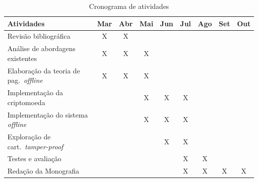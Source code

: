 \documentclass[
  12pt,
  a4paper,
  oneside,
  article,
]{abntex2}
\begin{document}
\begin{table}[htb]
	\caption{\label{tab:cronograma}Cronograma de atividades}
	\renewcommand{\arraystretch}{1.4}
	\begin{tabular}{|l|c|c|c|c|c|c|c|c|}
		\hline
		\textbf{Atividades}
		                                               & \textbf{Mar} & \textbf{Abr} & \textbf{Mai} & \textbf{Jun}
		                                               & \textbf{Jul} & \textbf{Ago} & \textbf{Set} & \textbf{Out}                 \\
		\hline
		Revisão bibliográfica                          & X            & X            &              &              &   &   &   &   \\
		\hline
		Análise de abordagens existentes               & X            & X            & X            &              &   &   &   &   \\
		\hline
		Elaboração da teoria de pag.\ \textit{offline} & X            & X            & X            &              &   &   &   &   \\
		\hline
		Implementação da criptomoeda                   &              &              & X            & X            & X &   &   &   \\
		\hline
		Implementação do sistema \textit{offline}      &              &              & X            & X            & X &   &   &   \\
		\hline
		Exploração de cart.\ \textit{tamper-proof}     &              &              &              & X            & X &   &   &   \\
		\hline
		Testes e avaliação                             &              &              &              &              & X & X &   &   \\
		\hline
		Redação da Monografia                          &              &              &              &              & X & X & X & X \\
		\hline
	\end{tabular}
\end{table}

\newpage
\postextual
\printbibliography[title=REFERÊNCIAS]
\end{document}
